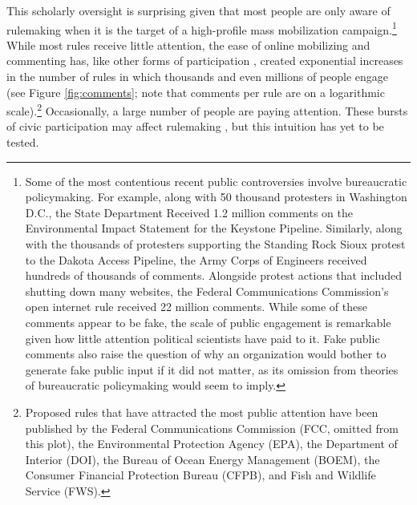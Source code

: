 This scholarly oversight is surprising given that most people are only aware of rulemaking when it is the target of a high-profile mass mobilization campaign.\footnote{
Some of the most contentious recent public controversies involve bureaucratic policymaking. For example, along with 50 thousand protesters in Washington D.C., the State Department Received 1.2 million comments on the Environmental Impact Statement for the Keystone Pipeline. Similarly, along with the thousands of protesters supporting the Standing Rock Sioux protest to the Dakota Access Pipeline, the Army Corps of Engineers received hundreds of thousands of comments. Alongside protest actions that included shutting down many websites, the Federal Communications Commission's open internet rule received 22 million comments. While some of these comments appear to be fake, the scale of public engagement is remarkable given how little attention political scientists have paid to it. Fake public comments also raise the question of why an organization would bother to generate fake public input if it did not matter, as its omission from theories of bureaucratic policymaking would seem to imply. %
} 
While most rules receive little attention, the ease of online mobilizing and commenting has, like other forms of participation \citep{Boulianne2018}, created exponential increases in the number of rules in which thousands and even millions of people engage (see Figure \ref{fig:comments}; note that comments per rule are on a logarithmic scale).\footnote{
Proposed rules that have attracted the most public attention have been published by the Federal Communications Commission (FCC, omitted from this plot), the Environmental Protection Agency (EPA), the Department of Interior (DOI), the Bureau of Ocean Energy Management (BOEM), the Consumer Financial Protection Bureau (CFPB), and Fish and Wildlife Service (FWS).
}
Occasionally, a large number of people are paying attention. These bursts of civic participation may affect rulemaking \citep{Coglianese2001}, but this intuition has yet to be tested.

